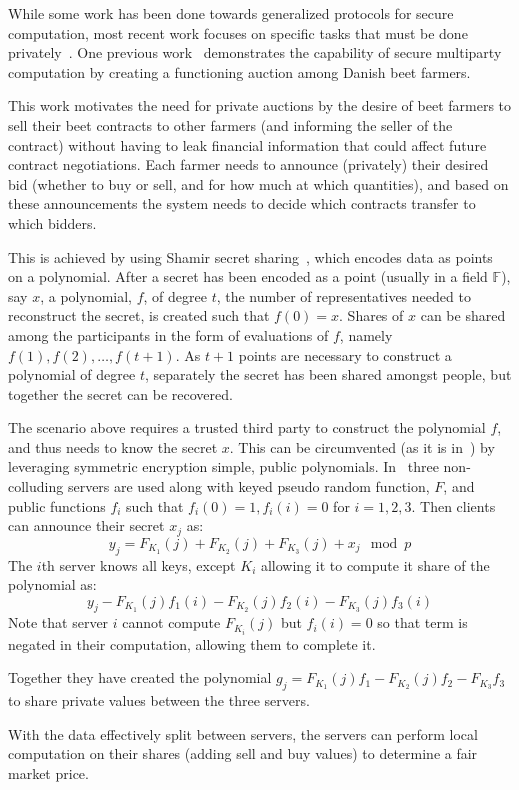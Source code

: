 While some work has been done towards generalized protocols for secure
computation, most recent work focuses on specific tasks that must be done
privately~\cite{bogetoft2009secure,miers2013zerocoin,parno2013pinocchio}. One
previous work~\cite{bogetoft2009secure} demonstrates the capability of secure
multiparty computation by creating a functioning auction among Danish beet
farmers. 

This work motivates the need for private auctions by the desire of beet farmers
to sell their beet contracts to other farmers (and informing the seller of the
contract) without having to leak financial information that could affect future
contract negotiations. Each farmer needs to announce (privately) their desired
bid (whether to buy or sell, and for how much at which quantities), and based on
these announcements the system needs to decide which contracts transfer to which
bidders.

This is achieved by using Shamir secret sharing~\cite{shamir1979share}, which
encodes data as points on a polynomial. After a secret has been encoded as a
point (usually in a field $\mathbb{F}$), say $x$, a polynomial, $f$, of degree
$t$, the number of representatives needed to reconstruct the secret, is created
such that $f(0)= x$. Shares of $x$ can be shared among the participants in the
form of evaluations of $f$, namely $f(1), f(2),\ldots, f(t+1)$. As $t+1$ points
are necessary to construct a polynomial of degree $t$, separately the secret has
been shared amongst people, but together the secret can be recovered.

The scenario above requires a trusted third party to construct the polynomial
$f$, and thus needs to know the secret $x$. This can be circumvented (as it is
in~\cite{bogetoft2009secure}) by leveraging symmetric encryption simple, public
polynomials. In~\cite{bogetoft2009secure} three non-colluding servers are used
along with keyed pseudo random function, $F$, and public functions $f_i$ such
that $f_i(0) = 1, f_i(i) = 0$ for $i=1,2,3$. Then clients can announce their
secret $x_j$ as:
\[
    y_j = F_{K_1}(j) + F_{K_2}(j) + F_{K_3}(j) + x_j \mod p
\]
The $i$th server knows all keys, except $K_i$ allowing it to compute it share of
the polynomial as:
\[
    y_j - F_{K_1}(j)f_1(i) - F_{K_2}(j)f_2(i) - F_{K_3}(j)f_3(i)
\]
Note that server $i$ cannot compute $F_{K_i}(j)$ but $f_i(i) = 0$ so that term
is negated in their computation, allowing them to complete it.

Together they have created the polynomial $g_j = F_{K_1}(j)f_1 - F_{K_2}(j)f_2
- F_{K_3}f_3$ to share private values between the three servers.

With the data effectively split between servers, the servers can perform local
computation on their shares (adding sell and buy values) to determine a fair
market price.